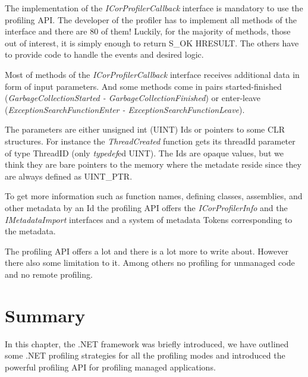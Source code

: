 The implementation of the \textit{ICorProfilerCallback} interface is mandatory to use the profiling API. The developer of the profiler has to implement all methods of the interface and there are 80 of them! Luckily, for the majority of methods, those out of interest, it is simply enough to return S\_OK HRESULT. The others have to provide code to handle the events and desired logic.

Most of methods of the \textit{ICorProfilerCallback} interface receives additional data in form of input parameters. And some methods come in pairs started-finished (\textit{GarbageCollectionStarted - GarbageCollectionFinished}) or enter-leave (\textit{ExceptionSearchFunctionEnter -  ExceptionSearchFunctionLeave}). 

The parameters are either unsigned int (UINT) Ids or pointers to some CLR structures. For instance the \textit{ThreadCreated} function gets its threadId parameter of type ThreadID (only \textit{typedef}ed UINT). The Ids are opaque values, but we think they are bare pointers to the memory where the metadate reside since they are always defined as UINT\_PTR.

To get more information such as function names, defining classes, assemblies, and other metadata by an Id the profiling API offers the \textit{ICorProfilerInfo} and the \textit{IMetadataImport} interfaces and a system of metadata Tokens corresponding to the metadata.

The profiling API offers a lot and there is a lot more to write about. However there also some limitation to it. Among others no profiling for unmanaged code and no remote profiling. 

\section{Summary}
In this chapter, the .NET framework was briefly introduced, we have outlined some .NET profiling strategies for all the profiling modes and introduced the powerful profiling API for profiling managed applications.
